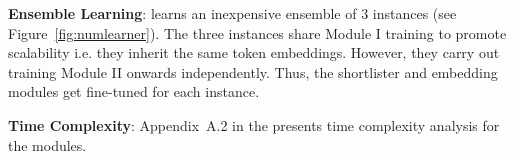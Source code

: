 
\textbf{Ensemble Learning}: \alg learns an inexpensive ensemble of 3 instances (see Figure~\ref{fig:numlearner}). The three instances share Module I training to promote scalability i.e. they inherit the same token embeddings. However, they carry out training Module II onwards independently. Thus, the shortlister and embedding modules get fine-tuned for each instance.


\textbf{Time Complexity}: Appendix~A.2 in the \suppl presents time complexity analysis for the \alg modules.